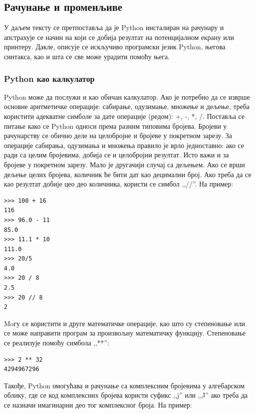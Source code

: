 \subsection{Рачунање и променљиве}

У даљем тексту се претпоставља да је Python инсталиран на рачунару и апстрахује се начин на који се добија резултат на потенцијалном екрану или принтеру. Дакле, описује се искључиво програмски језик Python, његова синтакса, као и шта се све може урадити помоћу њега.

\subsubsection{Python као калкулатор}

Python може да послужи и као обичан калкулатор\cite{van2003introduction,lutz2009learning}. Ако је потребно да се изврше основне аритметичке операције: сабирање, одузимање, множење и дељење, треба користити адекватне симболе за дате операције (редом): +, -, *, /. Поставља се питање како се Python односи према разним типовима бројева. Бројеви у рачунарству се обично деле на целобројне и бројеве у покретном зарезу. За операције сабирања, одузимања и множења правило је врло једноставно: ако се ради са целим бројевима, добија се и целобројни резултат. Исто важи и за бројеве у покретном зарезу. Мало је другачији случај са дељењем. Ако се врши дељење целих бројева, количник ће бити дат као децимални број. Ако треба да се као резултат добије цео део количника, користи се симбол ,,//''. На пример:

\begin{lstlisting}[caption = Примери операција са бројевима, label = racun]
>>> 100 + 16
116
>>> 96.0 - 11
85.0
>>> 11.1 * 10
111.0
>>> 20/5
4.0
>>> 20 / 8
2.5
>>> 20 // 8
2
\end{lstlisting}

Moгу се користити и друге математичке операције, као што су степеновање или се може направити програм за произвољну математичку функцију. Степеновање се реализује помоћу симбола ,,**'':

\begin{lstlisting}[caption = Степеновање, label = stepen]
>>> 2 ** 32
4294967296
\end{lstlisting}

Такође, Python омогућава и рачунање са комплексним бројевима у алгебарском облику, где се код комплексних бројева користи суфикс ,,j'' или ,,J'' ако треба да се назначи имагинарни део тог комплексног броја. На пример:

